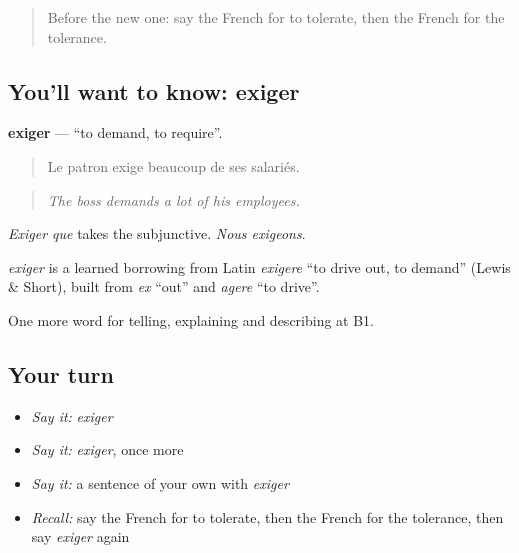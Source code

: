 \label{lesson:FR-C381-exiger}



\begin{quote}
Before the new one: say the French for to tolerate, then the French for the tolerance.
\end{quote}

\subsection*{You'll want to know: exiger}
\textbf{exiger} — \textquotedblleft{}to demand, to require\textquotedblright{}.

\begin{quote}
Le patron exige beaucoup de ses salariés.
\end{quote}

\begin{quote}
\emph{The boss demands a lot of his employees.}
\end{quote}

\emph{Exiger que} takes the subjunctive. \emph{Nous exigeons}.

\begin{cousinweb}
\emph{exiger} is a learned borrowing from Latin \emph{exigere} \textquotedblleft{}to drive out, to demand\textquotedblright{} (Lewis \& Short), built from \emph{ex} \textquotedblleft{}out\textquotedblright{} and \emph{agere} \textquotedblleft{}to drive\textquotedblright{}.
\end{cousinweb}

\begin{grammarlens}[title={What you've built}]
One more word for telling, explaining and describing at B1.
\end{grammarlens}

\subsection*{Your turn}
\begin{itemize}
\raggedright
  \item \emph{Say it:} \emph{exiger}
  \item \emph{Say it:} \emph{exiger}, once more
  \item \emph{Say it:} a sentence of your own with \emph{exiger}
  \item \emph{Recall:} say the French for to tolerate, then the French for the tolerance, then say \emph{exiger} again
\end{itemize}

